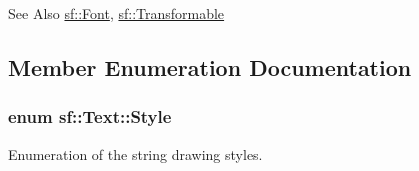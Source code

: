 \begin{DoxySeeAlso}{See Also}
\hyperlink{classsf_1_1_font}{sf\-::\-Font}, \hyperlink{classsf_1_1_transformable}{sf\-::\-Transformable} 
\end{DoxySeeAlso}


\subsection{Member Enumeration Documentation}
\hypertarget{classsf_1_1_text_aa8add4aef484c6e6b20faff07452bd82}{
\subsubsection[{Style}]{\setlength{\rightskip}{0pt plus 5cm}enum {\bf sf\-::\-Text\-::\-Style}}}\label{classsf_1_1_text_aa8add4aef484c6e6b20faff07452bd82}


Enumeration of the string drawing styles. 

